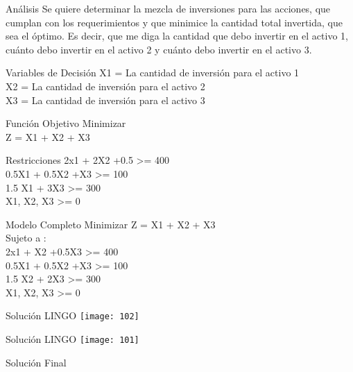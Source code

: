 \documentclass{beamer}
\begin{document}
\begin{frame}[fragile]{Análisis}
Se quiere determinar la mezcla de inversiones  para las acciones, que cumplan con los requerimientos  y que minimice la cantidad total invertida, que sea el óptimo. Es decir, que me diga la cantidad que debo invertir en el activo 1, cuánto debo invertir en el activo 2 y cuánto debo invertir en el activo 3.

\end{frame}

\begin{frame}[fragile]{Variables de Decisión}
X1 = La cantidad de inversión para el activo 1\\
X2 = La cantidad de inversión para el activo 2\\
X3 = La cantidad de inversión para el activo 3\\

\end{frame}

\begin{frame}[fragile]{Función Objetivo}
Minimizar\\
Z = X1 + X2 + X3\\
\end{frame}

\begin{frame}[fragile]{Restricciones}
2x1 + 2X2 +0.5  >= 400\\
0.5X1 + 0.5X2 +X3 >= 100\\
1.5 X1 + 3X3 >= 300\\
X1, X2, X3 >= 0\\

\end{frame}

\begin{frame}[fragile]{Modelo Completo}
Minimizar
Z = X1 + X2 + X3\\
Sujeto a :\\
2x1 + X2 +0.5X3  >= 400\\
0.5X1 + 0.5X2 +X3 >= 100\\
1.5 X2 + 2X3 >= 300\\
X1, X2, X3 >= 0\\

\end{frame}

\begin{frame}[fragile]{Solución LINGO}
    \texttt{[image: 102]}
\end{frame}
\begin{frame}[fragile]{Solución LINGO}
    \texttt{[image: 101]}
\end{frame}

\begin{frame}[fragile]{Solución Final}
\end{frame}
\end{document}
